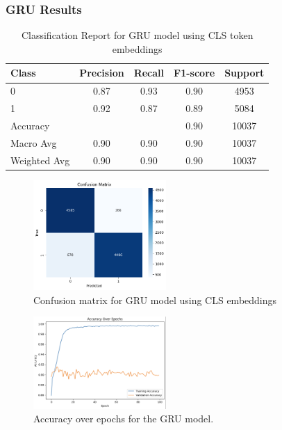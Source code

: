 \subsubsection{GRU Results}

\begin{table}[H]
\centering
\caption{Classification Report for GRU model using CLS token embeddings}
\label{tab:gru_classification_report}
\begin{tabular}{lcccc}
\toprule
Class        & Precision & Recall & F1-score & Support \\
\midrule
0            & 0.87      & 0.93   & 0.90     & 4953    \\
1            & 0.92      & 0.87   & 0.89     & 5084    \\
\midrule
Accuracy     &           &        & 0.90     & 10037   \\
Macro Avg    & 0.90      & 0.90   & 0.90     & 10037   \\
Weighted Avg & 0.90      & 0.90   & 0.90     & 10037   \\
\bottomrule
\end{tabular}
\end{table}

\begin{figure}[H]
    \centering
    \includegraphics[width=0.45\textwidth]{images/confusion_matrix_gru.png}
    \caption{Confusion matrix for GRU model using CLS embeddings}
    \label{fig:confusion_gru}
\end{figure}

\begin{figure}[H]
    \centering
    \includegraphics[width=0.45\textwidth]{images/accuracy_over_epoch_gru.png}
    \caption{Accuracy over epochs for the GRU model.}
    \label{fig:accuracy_gru}
\end{figure}

